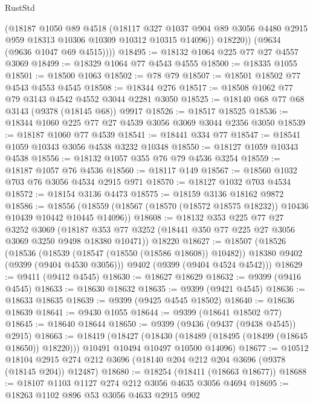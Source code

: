 \begin{lexlean}{RustStd}
\begin{coremodule}
            (@18187
              @1050
              @89
              @4518
              (@18117
                @327
                @1037
                @904
                @89
                @3056
                @4480
                @2915
                @959
                @18313
                @10306
                @10309
                @10312
                @10315
                @14096))
            @18220))
        (@9634 (@9636 @1047 @69 @4515))))
@18495 := @18132 @1064 @225 @77 @27 @4557 @3069
@18499 := @18329 @1064 @77 @4543 @4555
@18500 := @18335 @1055
@18501 := @18500 @1063
@18502 := @78 @79
@18507 := @18501 @18502 @77 @4543 @4553 @4545
@18508 := @18344 @276
@18517 := @18508 @1062 @77 @79 @3143 @4542 @4552 @3044 @2281 @3050
@18525 := @18140 @68 @77 @68 @3143 (@9378 (@18145 @68)) @9917
@18526 := @18517 @18525
@18536 := @18344 @1060 @225 @77 @27 @4539 @3056 @3069 @3044 @2356 @3050
@18539 := @18187 @1060 @77 @4539
@18541 := @18441 @334 @77
@18547 := @18541 @1059 @10343 @3056 @4538 @3232 @10348
@18550 := @18127 @1059 @10343 @4538
@18556 := @18132 @1057 @355 @76 @79 @4536 @3254
@18559 := @18187 @1057 @76 @4536
@18560 := @18117 @149
@18567 := @18560 @1032 @703 @76 @3056 @4534 @2915 @971
@18570 := @18127 @1032 @703 @4534
@18572 := @18154 @3136 @4473
@18575 := @18159 @3136 @18162 @9872
@18586 := @18556
    (@18559 (@18567 (@18570 (@18572 @18575 @18232)) @10436 @10439 @10442 @10445 @14096))
@18608 := @18132
    @353
    @225
    @77
    @27
    @3252
    @3069
    (@18187 @353 @77 @3252 (@18441 @350 @77 @225 @27 @3056 @3069 @3250 @9498 @18380 @10471))
    @18220
@18627 := @18507
    (@18526
      (@18536
        (@18539 (@18547 (@18550 (@18586 @18608)) @10482))
        @18380
        @9402
        (@9399 (@9404 @4530 @3056)))
      @9402
      (@9399 (@9404 @4524 @4542)))
@18629 := @9411 (@9412 @4545)
@18630 := @18627 @18629
@18632 := @9399 (@9416 @4545)
@18633 := @18630 @18632
@18635 := @9399 (@9421 @4545)
@18636 := @18633 @18635
@18639 := @9399 (@9425 @4545 @18502)
@18640 := @18636 @18639
@18641 := @9430 @1055
@18644 := @9399 (@18641 @18502 @77)
@18645 := @18640 @18644
@18650 := @9399 (@9436 (@9437 (@9438 @4545)) @2915)
@18663 := @18419
    (@18427
      (@18430 (@18489 (@18495 (@18499 (@18645 @18650)) @18220)))
      @10491
      @10494
      @10497
      @10500
      @14096)
@18677 := @10512
    @18104
    @2915
    @274
    @212
    @3696
    (@18140 @204 @212 @204 @3696 (@9378 (@18145 @204)) @12487)
@18680 := @18254 (@18411 (@18663 @18677))
@18688 := @18107 @1103 @1127 @274 @212 @3056 @4635 @3056 @4694
@18695 := @18263 @1102 @896 @53 @3056 @4633 @2915 @902

\end{coremodule}
\end{lexlean}
